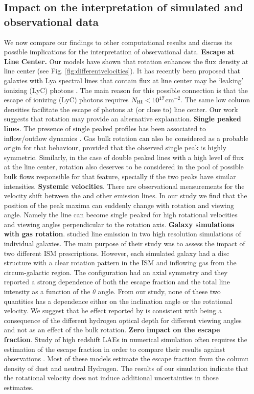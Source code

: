 \subsection{Impact on the interpretation of simulated and
observational data}
We now compare our findings to other computational results and discuss
its possible implications for the interpretation of observational data.
{\bf Escape at Line Center.} Our models have shown that rotation
enhances the flux density at line center (see Fig. \ref{fig:differentvelocities}). It has
recently been proposed that galaxies with Lya spectral lines that
contain flux at line center may be `leaking' ionizing (LyC) photons
\citep{Behrens2014,2014arXiv1404.2958V}. The main reason for this possible
connection is that the escape of ionizing (LyC) photons requires
$N_{\rm HI} < 10^{17} $cm$^{-2}$. The same low column densities facilitate the escape of
\ly photons at (or close to) line center. Our work suggests that
rotation may provide an alternative explanation.
{\bf Single peaked lines}. The presence of single peaked profiles has
been associated to inflow/outflow dynamics
\citep{Verhamme06,DijkstraKramer}.
Gas bulk rotation can also be considered as a probable origin for that
behaviour, provided that the observed single peak is highly
symmetric.
Similarly, in the case of double peaked lines with a high
level of flux at the line center, rotation also deserves to be
considered in the pool of possible bulk flows responsible for that feature,
specially if the two peaks have similar intensities.
{\bf Systemic velocities}. There are observational measurements for the
velocity shift between the \ly and other emission lines. In our study
we find that the position of the peak maxima can suddenly change with
rotation and viewing angle. Namely the line can become single peaked
for high rotational velocities and viewing angles perpendicular to the
rotation axis.
{\bf Galaxy simulations with gas rotation}. \cite{Verhamme12} studied \ly
line emission in two high resolution simulations of individual
galaxies.
The main purpose of their study was to assess the impact of two
different ISM prescriptions.
However, each simulated galaxy had a disc structure with a clear rotation pattern in
the ISM and inflowing gas from the circum-galactic region.
The configuration had an axial symmetry and they reported a strong dependence of both
the escape fraction and the total line intensity as a function of the
$\theta$ angle.
From our study, none of these two quantities has a dependence either
on the inclination angle or the rotational velocity.
We suggest that he effect reported by \cite{Verhamme12} is
consistent with being a consequence of the different hydrogen optical
depth for different viewing angles and not as an effect of the bulk
rotation.
{\bf Zero impact on the \ly escape fraction}. Study of
high redshift LAEs in numerical simulation often requires the
estimation of the \ly escape fraction in order to compare their
results against observations
\citep{CLARA,Dayal2012,Forero12,Orsi12,Garel2012}. Most of these
models estimate the escape fraction from the column density of dust and
neutral Hydrogen. The results of our simulation indicate that the
rotational velocity does not induce additional uncertainties in those
estimates.
